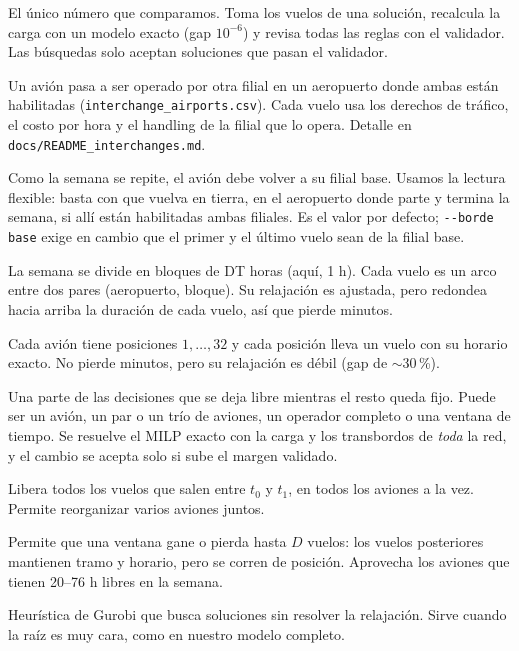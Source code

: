 \documentclass[11pt,a4paper]{article}
\begin{document}
\begin{description}[style=nextline, leftmargin=1.2em, itemsep=3pt]
  \item[Margen validado] El único número que comparamos. Toma los vuelos de una solución, recalcula la carga con un modelo exacto (gap $10^{-6}$) y revisa todas las reglas con el validador. Las búsquedas solo aceptan soluciones que pasan el validador.
  \item[Interchange] Un avión pasa a ser operado por otra filial en un aeropuerto donde ambas están habilitadas (\texttt{interchange\_airports.csv}). Cada vuelo usa los derechos de tráfico, el costo por hora y el handling de la filial que lo opera. Detalle en \texttt{docs/README\_interchanges.md}.
  \item[Borde flexible] Como la semana se repite, el avión debe volver a su filial base. Usamos la lectura flexible: basta con que vuelva en tierra, en el aeropuerto donde parte y termina la semana, si allí están habilitadas ambas filiales. Es el valor por defecto; \texttt{-{}-borde base} exige en cambio que el primer y el último vuelo sean de la filial base.
  \item[Red espacio-tiempo] La semana se divide en bloques de DT horas (aquí, 1 h). Cada vuelo es un arco entre dos pares (aeropuerto, bloque). Su relajación es ajustada, pero redondea hacia arriba la duración de cada vuelo, así que pierde minutos.
  \item[MILP en tiempo continuo] Cada avión tiene posiciones $1, \dots, 32$ y cada posición lleva un vuelo con su horario exacto. No pierde minutos, pero su relajación es débil (gap de $\sim$30\,\%).
  \item[Vecindario] Una parte de las decisiones que se deja libre mientras el resto queda fijo. Puede ser un avión, un par o un trío de aviones, un operador completo o una ventana de tiempo. Se resuelve el MILP exacto con la carga y los transbordos de \emph{toda} la red, y el cambio se acepta solo si sube el margen validado.
  \item[Ventana de tiempo] Libera todos los vuelos que salen entre $t_0$ y $t_1$, en todos los aviones a la vez. Permite reorganizar varios aviones juntos.
  \item[Desplazamiento] Permite que una ventana gane o pierda hasta $D$ vuelos: los vuelos posteriores mantienen tramo y horario, pero se corren de posición. Aprovecha los aviones que tienen 20--76 h libres en la semana.
  \item[NoRel] Heurística de Gurobi que busca soluciones sin resolver la relajación. Sirve cuando la raíz es muy cara, como en nuestro modelo completo.
\end{description}
\end{document}
